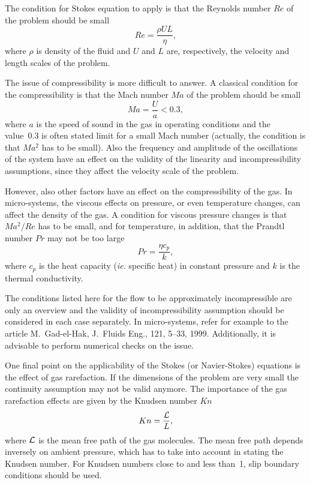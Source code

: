 The condition for Stokes equation to apply is that the Reynolds number
$Re$ of the problem should be small
\begin{equation}
Re = \frac{\rho UL}{\eta},
\end{equation}
where $\rho$ is density of the fluid and $U$ and $L$ are,
respectively, the velocity and length scales of the problem.

The issue of compressibility is more difficult to answer. A classical
condition for the compressibility is that the Mach number $Ma$ of the
problem should be small
\begin{equation}
Ma = \frac{U}{a} < 0.3,
\end{equation}
where $a$ is the speed of sound in the gas in operating conditions and
the value~0.3 is often stated limit for a small Mach number (actually,
the condition is that $Ma^2$ has to be small).  Also the frequency and
amplitude of the oscillations of the system have an effect on the
validity of the linearity and incompressibility assumptions, since
they affect the velocity scale of the problem.

However, also other factors have an effect on the compressibility of
the gas. In micro-systems, the viscous effects on pressure, or even
temperature changes, can affect the density of the gas. A
condition for viscous pressure changes is that $Ma^2/Re$ has to be
small, and for temperature, in addition, that the Prandtl number $Pr$
may not be too large
\begin{equation}
Pr = \frac{\eta c_p}{k},
\end{equation}
where $c_p$ is the heat capacity ({\em ie.} specific heat) in constant
pressure and $k$ is the thermal conductivity.

The conditions listed here for the flow to be approximately
incompressible are only an overview and the validity of
incompressibility assumption should be considered in each case
separately. In micro-systems, refer for example to the article
M.~Gad-el-Hak, J.~Fluids Eng., 121, 5--33, 1999. Additionally, it is
advisable to perform numerical checks on the issue.

One final point on the applicability of the Stokes (or Navier-Stokes)
equations is the effect of gas rarefaction. If the dimensions of the
problem are very small the continuity assumption may not be valid
anymore. The importance of the gas rarefaction effects are given by
the Knudsen number $Kn$
\begin{equation}
Kn = \frac{{\cal L}}{L},
\end{equation}
where ${\cal L}$ is the mean free path of the gas molecules. The mean
free path depends inversely on ambient pressure, which has to take
into account in stating the Knudsen number. For Knudsen numbers close
to and less than~1, slip boundary conditions should be used.

